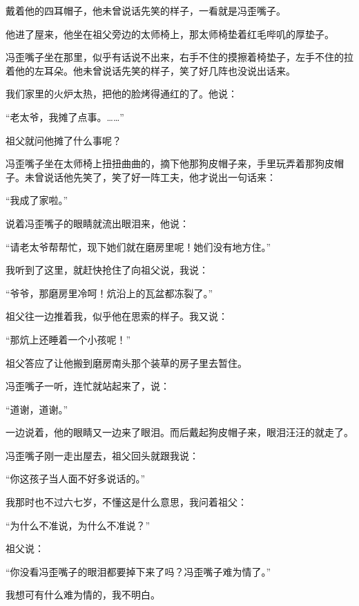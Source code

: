 \par 戴着他的四耳帽子，他未曾说话先笑的样子，一看就是冯歪嘴子。
\par 他进了屋来，他坐在祖父旁边的太师椅上，那太师椅垫着红毛哔叽的厚垫子。
\par 冯歪嘴子坐在那里，似乎有话说不出来，右手不住的摸擦着椅垫子，左手不住的拉着他的左耳朵。他未曾说话先笑的样子，笑了好几阵也没说出话来。
\par 我们家里的火炉太热，把他的脸烤得通红的了。他说：
\par “老太爷，我摊了点事。……”
\par 祖父就问他摊了什么事呢？
\par 冯歪嘴子坐在太师椅上扭扭曲曲的，摘下他那狗皮帽子来，手里玩弄着那狗皮帽子。未曾说话他先笑了，笑了好一阵工夫，他才说出一句话来：
\par “我成了家啦。”
\par 说着冯歪嘴子的眼睛就流出眼泪来，他说：
\par “请老太爷帮帮忙，现下她们就在磨房里呢！她们没有地方住。”
\par 我听到了这里，就赶快抢住了向祖父说，我说：
\par “爷爷，那磨房里冷呵！炕沿上的瓦盆都冻裂了。”
\par 祖父往一边推着我，似乎他在思索的样子。我又说：
\par “那炕上还睡着一个小孩呢！”
\par 祖父答应了让他搬到磨房南头那个装草的房子里去暂住。
\par 冯歪嘴子一听，连忙就站起来了，说：
\par “道谢，道谢。”
\par 一边说着，他的眼睛又一边来了眼泪。而后戴起狗皮帽子来，眼泪汪汪的就走了。
\par 冯歪嘴子刚一走出屋去，祖父回头就跟我说：
\par “你这孩子当人面不好多说话的。”
\par 我那时也不过六七岁，不懂这是什么意思，我问着祖父：
\par “为什么不准说，为什么不准说？”
\par 祖父说：
\par “你没看冯歪嘴子的眼泪都要掉下来了吗？冯歪嘴子难为情了。”
\par 我想可有什么难为情的，我不明白。

